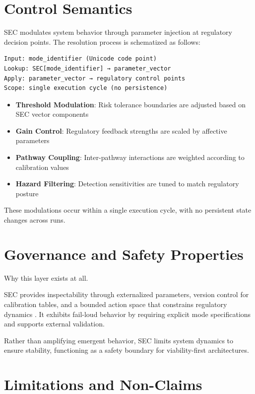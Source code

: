 \documentclass[12pt,a4paper]{article}
\begin{document}
\section{Control Semantics}

SEC modulates system behavior through parameter injection at regulatory decision points. The resolution process is schematized as follows:

\begin{verbatim}
Input: mode_identifier (Unicode code point)
Lookup: SEC[mode_identifier] → parameter_vector
Apply: parameter_vector → regulatory control points
Scope: single execution cycle (no persistence)
\end{verbatim}

\begin{itemize}
    \item \textbf{Threshold Modulation}: Risk tolerance boundaries are adjusted based on SEC vector components
    \item \textbf{Gain Control}: Regulatory feedback strengths are scaled by affective parameters
    \item \textbf{Pathway Coupling}: Inter-pathway interactions are weighted according to calibration values
    \item \textbf{Hazard Filtering}: Detection sensitivities are tuned to match regulatory posture
\end{itemize}

These modulations occur within a single execution cycle, with no persistent state changes across runs.

\section{Governance and Safety Properties}

Why this layer exists at all.

SEC provides inspectability through externalized parameters, version control for calibration tables, and a bounded action space that constrains regulatory dynamics \cite{Conant1970}. It exhibits fail-loud behavior by requiring explicit mode specifications and supports external validation.

Rather than amplifying emergent behavior, SEC limits system dynamics to ensure stability, functioning as a safety boundary for viability-first architectures.

\section{Limitations and Non-Claims}
\end{document}
